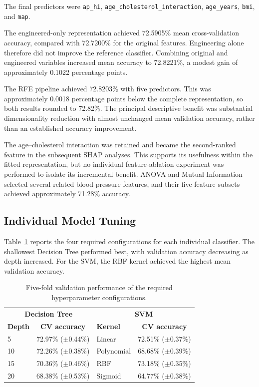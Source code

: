 \documentclass[11pt,a4paper]{article}
\newcommand{\code}[1]{\texttt{#1}}
\begin{document}
The final predictors were \code{ap\_hi},
\code{age\_cholesterol\_interaction}, \code{age\_years},
\code{bmi}, and \code{map}. 

The engineered-only representation achieved 72.5905\% mean
cross-validation accuracy, compared with 72.7200\% for the original
features. Engineering alone therefore did not improve the reference
classifier. Combining original and engineered variables increased
mean accuracy to 72.8221\%, a modest gain of approximately 0.1022
percentage points.

The RFE pipeline achieved 72.8203\% with five predictors. This was
approximately 0.0018 percentage points below the complete representation,
so both results rounded to 72.82\%. The principal descriptive benefit
was substantial dimensionality reduction with almost unchanged mean
validation accuracy, rather than an established accuracy improvement.

The age--cholesterol interaction was retained and became the
second-ranked feature in the subsequent SHAP analyses. This supports
its usefulness within the fitted representation, but no individual
feature-ablation experiment was performed to isolate its incremental
benefit. ANOVA and Mutual Information selected several related
blood-pressure features, and their five-feature subsets achieved
approximately 71.28\% accuracy.

\subsection{Individual Model Tuning}

Table~\ref{tab:tuning} reports the four required configurations for each individual classifier. The shallowest Decision Tree performed best, with validation accuracy decreasing as depth increased. For the SVM, the RBF kernel achieved the highest mean validation accuracy.

\begin{table}[htbp]
\centering
\small
\begin{tabular}{lc|lc}
\toprule
\multicolumn{2}{c|}{\textbf{Decision Tree}} & \multicolumn{2}{c}{\textbf{SVM}}\\
\textbf{Depth} & \textbf{CV accuracy} & \textbf{Kernel} & \textbf{CV accuracy}\\
\midrule
5 & 72.97\% ($\pm$0.44\%) & Linear & 72.51\% ($\pm$0.37\%)\\
10 & 72.26\% ($\pm$0.38\%) & Polynomial & 68.68\% ($\pm$0.39\%)\\
15 & 70.36\% ($\pm$0.46\%) & RBF & 73.18\% ($\pm$0.35\%)\\
20 & 68.38\% ($\pm$0.53\%) & Sigmoid & 64.77\% ($\pm$0.38\%)\\
\bottomrule
\end{tabular}
\caption{Five-fold validation performance of the required hyperparameter configurations.}
\label{tab:tuning}
\end{table}
\end{document}
